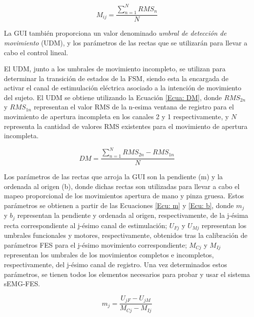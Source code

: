 
\begin{equation}
	M_{ij} = \frac{\sum_{n=1}^{N}RMS_{n}}{N}
	\label{Ecu: U_RMS}
\end{equation}

La GUI también proporciona un valor denominado \emph{umbral de detección de movimiento} (UDM), y los parámetros de las rectas que se utilizarán para llevar a cabo el control lineal.

El UDM, junto a los umbrales de movimiento incompleto, se utilizan para determinar la transición de estados de la FSM, siendo esta la encargada de activar el canal de estimulación eléctrica asociado a la intención de movimiento del sujeto. El UDM se obtiene utilizando la Ecuación \ref{Ecua: DM}, donde $RMS_{2n}$ y $RMS_{1n}$ representan el valor RMS de la n-esima ventana de registro para el movimiento de apertura incompleta en los canales 2 y 1 respectivamente, y $N$ representa la cantidad de valores RMS existentes para el movimiento de apertura incompleta.

\begin{equation}
	DM = \frac{\sum_{n=1}^{N}RMS_{2n}-RMS_{1n}}{N}
	\label{Ecua: DM}
\end{equation}

Los parámetros de las rectas que arroja la GUI son la pendiente (m) y la ordenada al origen (b), donde dichas rectas son utilizadas para llevar a cabo el mapeo proporcional de los movimientos apertura de mano y pinza gruesa. Estos parámetros se obtienen a partir de las Ecuaciones \ref{Ecu: m} y \ref{Ecu: b}, donde $m_{j}$ y $b_{j}$ representan la pendiente y ordenada al origen, respectivamente, de la j-ésima recta correspondiente al j-ésimo canal de estimulación; $U_{Fj}$ y $U_{Mj}$ representan los umbrales funcionales y motores, respectivamente, obtenidos tras la calibración de parámetros FES para el j-ésimo movimiento correspondiente; $M_{Cj}$ y $M_{Ij}$ representan los umbrales de los movimientos completos e incompletos, respectivamente, del j-ésimo canal de registro. Una vez determinados estos parámetros, se tienen todos los elementos necesarios para probar y usar el sistema sEMG-FES.

\vfill
\begin{equation}
	m_{j} = \frac{ U_{jF} - U_{jM} }{ M_{Cj} - M_{Ij} }
	\label{Ecu: m}
\end{equation}


